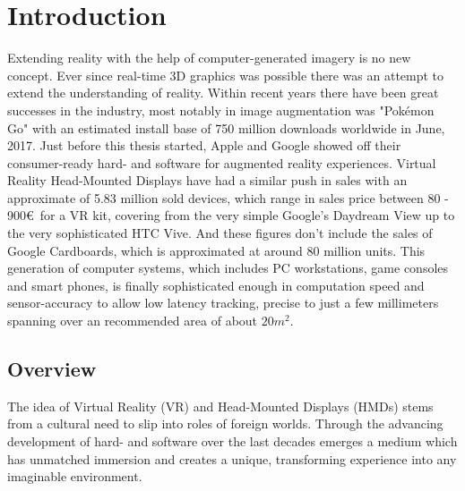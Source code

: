 %
\chapter{Introduction}
\label{sec:intro}


Extending reality with the help of computer-generated imagery is no new 
concept. Ever since real-time 3D graphics was possible there was an attempt to 
extend the understanding of reality. Within recent years there have been 
great successes in the industry, most notably in image augmentation was 
"Pokémon Go" with an estimated install base of 750 million downloads 
worldwide in June, 2017\cite{appannie:2017}. Just before this thesis 
started, Apple and Google showed off their consumer-ready hard- and software 
for augmented reality experiences. 
\newline
Virtual Reality Head-Mounted Displays have had a similar push in sales with an 
approximate of 5.83 million sold devices, which range in sales price between 
80 - 900€ for a VR kit, covering from the very simple Google's Daydream View up 
to the very sophisticated HTC Vive\cite{erguerel:2017}. And these figures don't 
include the sales of Google Cardboards, which is approximated at around 80  
million units\cite{superdata:market-brief:2017}.
\newline
This generation of computer systems, which includes PC workstations, game 
consoles and smart phones, is finally sophisticated enough in computation speed 
and sensor-accuracy to allow low latency tracking, precise to just a few 
millimeters spanning over an recommended area of about 
$20m^2$\cite{htc:vive-manual:2016}.

\section{Overview}
\label{sec:intro:outline}

The idea of Virtual Reality (VR) and Head-Mounted Displays (HMDs) stems from a 
cultural need to slip into roles of foreign worlds. Through the advancing 
development of hard- and software over the last decades emerges a medium which 
has unmatched immersion and creates a unique, transforming experience into any 
imaginable environment.

